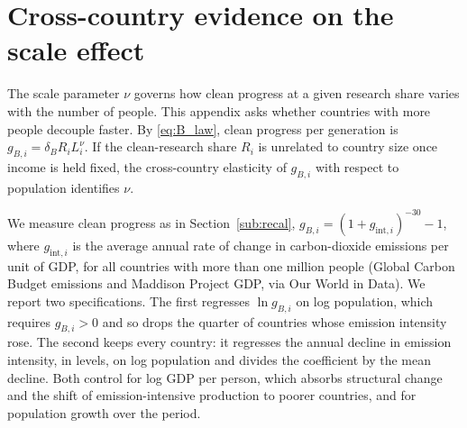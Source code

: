 \documentclass[11pt]{article}
\begin{document}
\clearpage
\section{Cross-country evidence on the scale effect}
\label{app:nu}
\setcounter{table}{0}
The scale parameter $\nu$ governs how clean progress at a given research share varies with the number of
people. This appendix asks whether countries with more people decouple faster. By \eqref{eq:B_law},
clean progress per generation is $g_{B,i}=\delta_BR_iL_i^{\nu}$. If the clean-research share $R_i$ is
unrelated to country size once income is held fixed, the cross-country elasticity of $g_{B,i}$ with
respect to population identifies $\nu$.

We measure clean progress as in Section~\ref{sub:recal}, $g_{B,i}=(1+g_{\text{int},i})^{-30}-1$, where
$g_{\text{int},i}$ is the average annual rate of change in carbon-dioxide emissions per unit of GDP, for
all countries with more than one million people (Global Carbon Budget emissions and Maddison Project GDP,
via Our World in Data). We report two specifications.
The first regresses $\ln g_{B,i}$ on log population, which requires $g_{B,i}>0$ and so drops the quarter of
countries whose emission intensity rose. The second keeps every country: it regresses the annual decline
in emission intensity, in levels, on log population and divides the coefficient by the mean decline. Both
control for log GDP per person, which absorbs structural change and the shift of emission-intensive
production to poorer countries, and for population growth over the period.
\end{document}
